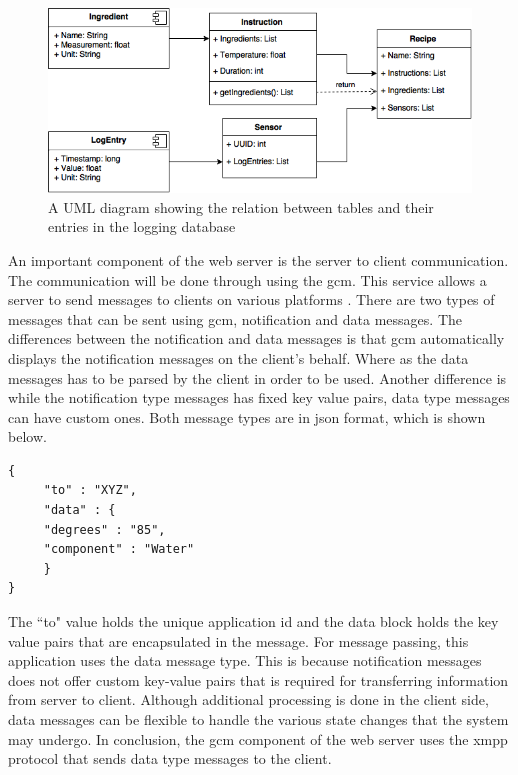 \documentclass{article}
\begin{document}
\begin{figure}[H]
\begin{center}
\includegraphics[scale=0.50]{database-uml-diagram.png}
\caption{A UML diagram showing the relation between tables and their entries in the logging database}
\label{fig:database-diagram}
\end{center}
\end{figure}

An important component of the web server is the server to client communication. The communication will be done through using the \gls{gcm}. This service allows a server to send messages to clients on various platforms \cite{gcm}.  There are two types of messages that can be sent using \gls{gcm}, notification and data messages. The differences between the notification and data messages is that \gls{gcm} automatically displays the notification messages on the client's behalf. Where as the data messages has to be parsed by the client in order to be used. Another difference is while the notification type messages has fixed key value pairs, data type messages can have custom ones. Both message types are in \gls{json} format, which is shown below.

\begin{lstlisting}
{
     "to" : "XYZ",
     "data" : {
     "degrees" : "85",
     "component" : "Water"
     }
}
\end{lstlisting}

The ``to" value holds the unique application id and the data block holds the key value pairs that are encapsulated in the message.
For message passing, this application uses the data message type. This is because notification messages does not offer custom key-value pairs that is required for transferring information from server to client. Although additional processing is done in the client side, data messages can be flexible to handle the various state changes that the system may undergo. In conclusion, the \gls{gcm} component of the web server uses the \gls{xmpp} protocol that sends data type messages to the client. 
\end{document}

